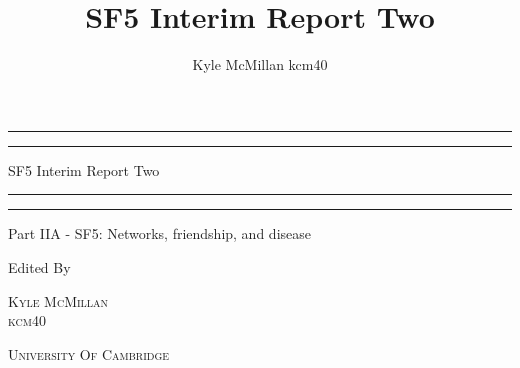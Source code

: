 \documentclass[a4paper, 11pt, oneside]{report}
\author{Kyle McMillan kcm40}
\title{SF5 Interim Report Two}
\begin{document}

\begin{titlepage}
    \centering %
	
	\scshape %
	
	\vspace*{\baselineskip} %
	
	\rule{\textwidth}{1.6pt}\vspace*{-\baselineskip}\vspace*{2pt} %
	\rule{\textwidth}{0.4pt} %
	
	\vspace{0.75\baselineskip} %
	
	{\LARGE SF5 Interim Report Two} %
	
	\vspace{0.75\baselineskip} %
	
	\rule{\textwidth}{0.4pt}\vspace*{-\baselineskip}\vspace{3.2pt} %
	\rule{\textwidth}{1.6pt} %
	
	\vspace{2\baselineskip} %
	
	
	Part IIA - SF5: Networks, friendship, and disease %
	
	\vspace*{3\baselineskip} %
	
	
	Edited By
	
	\vspace{0.5\baselineskip} %
	
	{\scshape\Large Kyle McMillan \\ kcm40} %
	
	\vspace{0.5\baselineskip} %
	
    \textsc{University Of Cambridge} %
	
	\vfill %

\end{titlepage}
\end{document}
